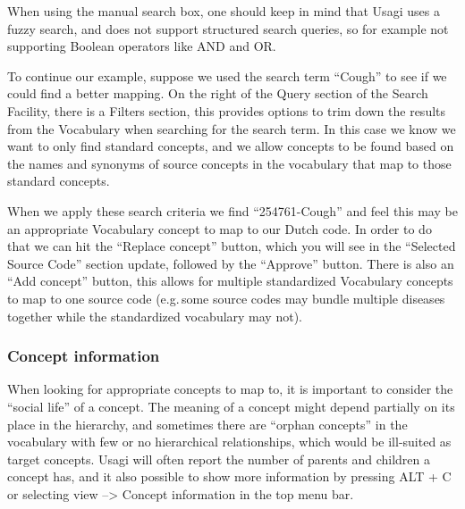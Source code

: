 \documentclass[11pt]{book}
\theoremstyle{definition}
\theoremstyle{definition}
\theoremstyle{definition}
\theoremstyle{remark}
\begin{document}
When using the manual search box, one should keep in mind that Usagi uses a fuzzy search, and does not support structured search queries, so for example not supporting Boolean operators like AND and OR.

To continue our example, suppose we used the search term ``Cough'' to see if we could find a better mapping. On the right of the Query section of the Search Facility, there is a Filters section, this provides options to trim down the results from the Vocabulary when searching for the search term. In this case we know we want to only find standard concepts, and we allow concepts to be found based on the names and synonyms of source concepts in the vocabulary that map to those standard concepts.

When we apply these search criteria we find ``254761-Cough'' and feel this may be an appropriate Vocabulary concept to map to our Dutch code. In order to do that we can hit the ``Replace concept'' button, which you will see in the ``Selected Source Code'' section update, followed by the ``Approve'' button. There is also an ``Add concept'' button, this allows for multiple standardized Vocabulary concepts to map to one source code (e.g.\,some source codes may bundle multiple diseases together while the standardized vocabulary may not).

\hypertarget{concept-information}{%
\subsubsection*{Concept information}\label{concept-information}}

When looking for appropriate concepts to map to, it is important to consider the ``social life'' of a concept. The meaning of a concept might depend partially on its place in the hierarchy, and sometimes there are ``orphan concepts'' in the vocabulary with few or no hierarchical relationships, which would be ill-suited as target concepts. Usagi will often report the number of parents and children a concept has, and it also possible to show more information by pressing ALT + C or selecting view --\textgreater{} Concept information in the top menu bar.
\end{document}
